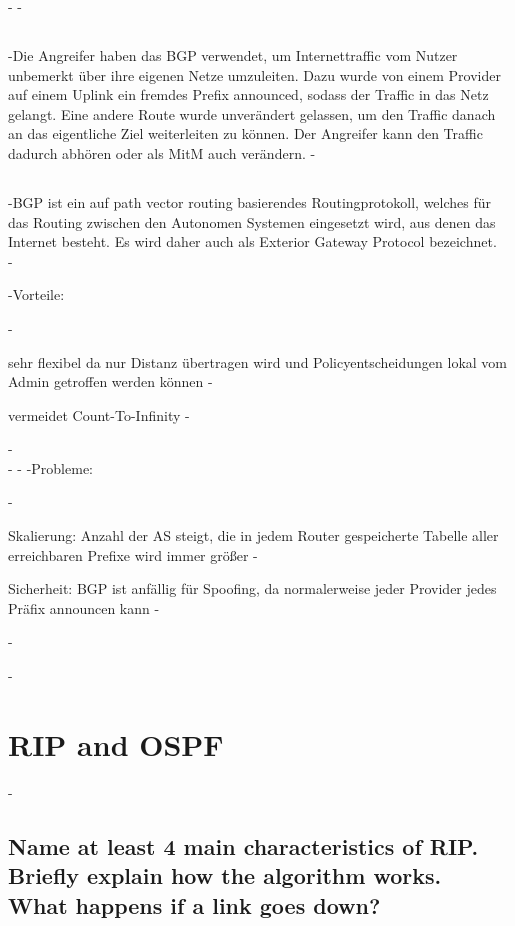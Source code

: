 \documentclass[a4paper,
			llpt,
			solution,
			accentcolor=tud2d,
			colorbacktitle
			]
			{tudexercise}
\newcommand{\8}{$\infty$}
\begin{document}
-
-\subsection{}
-Die Angreifer haben das BGP verwendet, um Internettraffic vom Nutzer unbemerkt über ihre eigenen Netze umzuleiten. Dazu wurde von einem Provider auf einem Uplink ein fremdes Prefix announced, sodass der Traffic in das Netz gelangt. Eine andere Route wurde unverändert gelassen, um den Traffic danach an das eigentliche Ziel weiterleiten zu können. Der Angreifer kann den Traffic dadurch abhören oder als MitM auch verändern.
-\subsection{}
-BGP ist ein auf path vector routing basierendes Routingprotokoll, welches für das Routing zwischen den Autonomen Systemen eingesetzt wird, aus denen das Internet besteht. Es wird daher auch als Exterior Gateway Protocol bezeichnet. \\
-\begin{multicols}{2}
-Vorteile: \begin{compactenum}
-\item sehr flexibel da nur Distanz übertragen wird und Policyentscheidungen lokal vom Admin getroffen werden können
-\item vermeidet Count-To-Infinity
-\end{compactenum}
-~\\
-\vfill
-\columnbreak
-Probleme: \begin{compactenum}
-\item Skalierung: Anzahl der AS steigt, die in jedem Router gespeicherte Tabelle aller erreichbaren Prefixe wird immer größer
-\item Sicherheit: BGP ist anfällig für Spoofing, da normalerweise jeder Provider jedes Präfix announcen  kann
-\end{compactenum}
-\end{multicols}
-\section{RIP and OSPF}
-\subsection{Name at least 4 main characteristics of RIP.\\Briefly explain how the algorithm works.\\ What happens if a link goes down?}
\end{document}
